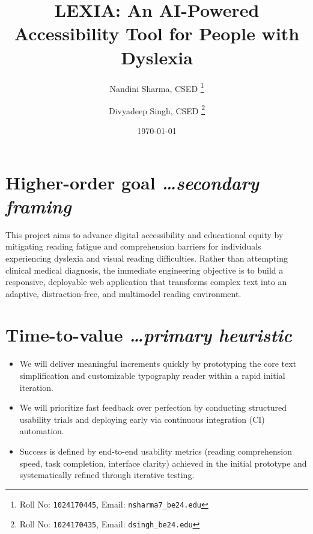 \documentclass[11pt,a4paper]{article}
\title{LEXIA: An AI-Powered Accessibility Tool for People with Dyslexia}
\author{
  Nandini Sharma, CSED%
  \thanks{Roll No: \texttt{1024170445}, %
    Email: \texttt{nsharma7\_be24\@thapar.edu}}
  \and 
  Divyadeep Singh, CSED%
  \thanks{Roll No: \texttt{1024170435}, %
    Email: \texttt{dsingh\_be24\@thapar.edu}}
}
\date{\today}
\newcommand{\BvrHint}[1]{%
  {\normalfont\normalsize\itshape\hfill #1}}
\begin{document}
\maketitle

\section{Higher-order goal%
  \BvrHint{\ldots secondary framing}}
This project aims to advance digital accessibility and educational equity by mitigating reading fatigue and comprehension barriers for individuals experiencing dyslexia and visual reading difficulties. Rather than attempting clinical medical diagnosis, the immediate engineering objective is to build a responsive, deployable web application that transforms complex text into an adaptive, distraction-free, and multimodel reading environment.

\section{Time-to-value %
\BvrHint{\ldots primary heuristic}}
\begin{itemize}[leftmargin=0.7cm]
    \item We will deliver meaningful increments quickly by prototyping the core text simplification and customizable typography reader within a rapid initial iteration.
    \item We will prioritize fast feedback over perfection by conducting structured usability trials and deploying early via continuous integration (CI) automation.
    \item Success is defined by end-to-end usability metrics (reading comprehension speed, task completion, interface clarity) achieved in the initial prototype and systematically refined through iterative testing.
\end{itemize}
\end{document}
